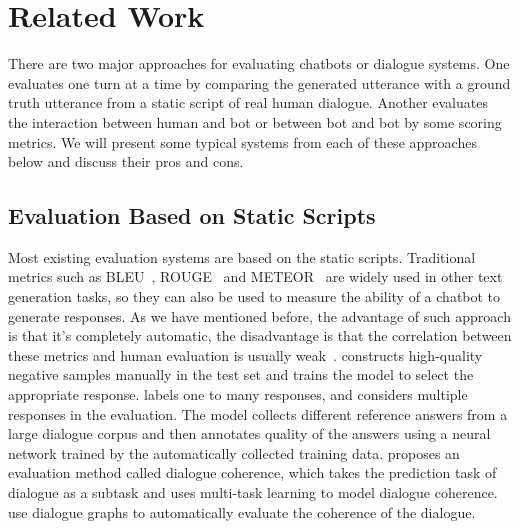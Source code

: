 \section{Related Work}

There are two major approaches for evaluating chatbots or dialogue systems.
One evaluates one turn at a time by comparing the generated utterance with
a ground truth utterance from a static script of real human dialogue.
Another evaluates the interaction between human and bot or between bot
and bot by some scoring metrics. We will present some typical systems from
each of these approaches below and discuss their pros and cons. 


\subsection{Evaluation Based on Static Scripts}

Most existing evaluation systems are based on the static scripts. 
Traditional metrics such as BLEU~\citep{bleu}, ROUGE~\citep{lin-2004-rouge} 
and METEOR~\citep{banerjee-lavie-2005-meteor} are widely used in 
other text generation tasks, so they can also be used to measure the 
ability of a chatbot to generate responses. As we have mentioned before, 
the advantage of such approach is that it's completely automatic,
the disadvantage is that the correlation between these metrics and 
human evaluation is usually weak~\citep{liu-etal-2016-evaluate}. 
\citet{sato-etal-2020-evaluating} 
constructs high-quality negative samples manually in the test set and 
trains the model to select the appropriate response. 
\citet{yuma-etal-2020-ubleu} labels one to many responses, 
and considers multiple responses in the evaluation. 
The model collects different reference answers from a large dialogue corpus 
and then annotates quality of the answers using a neural network 
trained by the automatically collected training data. 
\citet{mesgar-etal-2020-dialogue} proposes an evaluation method 
called dialogue coherence, which takes the prediction task of dialogue as a subtask and uses multi-task learning to model dialogue coherence. 
\citet{huang-etal-2020-grade} use dialogue graphs to automatically 
evaluate the coherence of the dialogue. 

